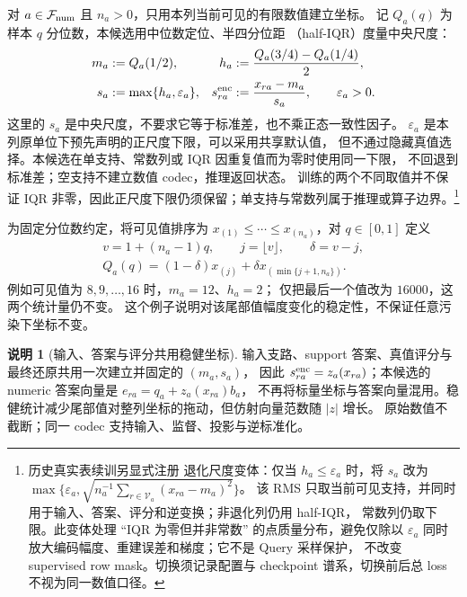 \documentclass[11pt,UTF8,fontset=fandol]{ctexart}
\numberwithin{equation}{section}
\theoremstyle{definition}
\newtheorem{remark}[definition]{说明}
\newcommand{\Fset}{\mathcal F}
\newcommand{\Vset}{\mathcal V}
\begin{document}
对 $a\in\Fset_{\rm num}$ 且 $n_a>0$，只用本列当前可见的有限数值建立坐标。
记 $Q_a(q)$ 为样本 $q$ 分位数，本候选用中位数定位、半四分位距
（half-IQR）度量中央尺度：
\begin{equation}
\begin{aligned}
  m_a&:=Q_a(1/2),&
  h_a&:=\frac{Q_a(3/4)-Q_a(1/4)}{2},\\
  s_a&:=\max\{h_a,\varepsilon_a\},&
  s^{\rm enc}_{ra}&:=\frac{x_{ra}-m_a}{s_a},\qquad\varepsilon_a>0.
\end{aligned}
\label{v53c:eq:robust-prep}
\end{equation}
这里的 $s_a$ 是中央尺度，不要求它等于标准差，也不乘正态一致性因子。
$\varepsilon_a$ 是本列原单位下预先声明的正尺度下限，可以采用共享默认值，
但不通过隐藏真值选择。本候选在单支持、常数列或 IQR 因重复值而为零时使用同一下限，
不回退到标准差；空支持不建立数值 codec，推理返回状态。
训练的两个不同取值并不保证 IQR 非零，因此正尺度下限仍须保留；单支持与常数列属于推理或算子边界。\footnote{历史真实表续训另显式注册
退化尺度变体：仅当 $h_a\le\varepsilon_a$ 时，将 $s_a$ 改为
$\max\{\varepsilon_a,\sqrt{n_a^{-1}\sum_{r\in\Vset_a}(x_{ra}-m_a)^2}\}$。
该 RMS 只取当前可见支持，并同时用于输入、答案、评分和逆变换；非退化列仍用 half-IQR，
常数列仍取下限。此变体处理 ``IQR 为零但并非常数'' 的点质量分布，避免仅除以
$\varepsilon_a$ 同时放大编码幅度、重建误差和梯度；它不是 Query 采样保护，
不改变 supervised row mask。切换须记录配置与 checkpoint 谱系，切换前后总 loss
不视为同一数值口径。}

为固定分位数约定，将可见值排序为 $x_{(1)}\le\cdots\le x_{(n_a)}$，对 $q\in[0,1]$ 定义
\begin{equation}
 \begin{gathered}
 v=1+(n_a-1)q,\qquad j=\lfloor v\rfloor,\qquad\delta=v-j,\\
 Q_a(q)=(1-\delta)x_{(j)}+\delta x_{(\min\{j+1,n_a\})}.
 \end{gathered}
 \label{eq:E:numeric-quantile}
\end{equation}
例如可见值为 $8,9,\ldots,16$ 时，$m_a=12$、$h_a=2$；
仅把最后一个值改为 $16000$，这两个统计量仍不变。
这个例子说明对该尾部值幅度变化的稳定性，不保证任意污染下坐标不变。

\begin{remark}[输入、答案与评分共用稳健坐标]
输入支路、support 答案、真值评分与最终还原共用一次建立并固定的 $(m_a,s_a)$，
因此 $s^{\rm enc}_{ra}=z_a(x_{ra})$；本候选的 numeric 答案向量是 $e_{ra}=q_a+z_a(x_{ra})b_a$，
不再将标量坐标与答案向量混用。稳健统计减少尾部值对整列坐标的拖动，但仿射向量范数随 $|z|$ 增长。
原始数值不截断；同一 codec 支持输入、监督、投影与逆标准化。
\end{remark}
\end{document}
